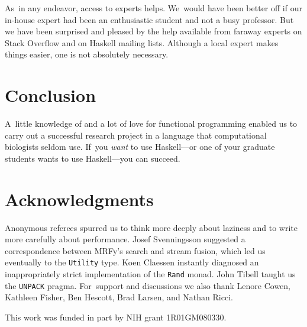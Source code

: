 \documentclass[]{jfp1}
\newcommand\mrfy{MRFy} %
\begin{document}


As~in any endeavor, access to experts helps.
We~would have been better off if our in-house expert had been an
enthusiastic student and not a busy professor.
But we have been surprised and pleased by the help available from
faraway experts on Stack Overflow and on Haskell mailing lists.
Although a local expert makes things easier, one is not
 absolutely necessary.

\section{Conclusion}

A~little knowledge of and a lot of love for functional programming
enabled us to carry out a successful research project in a language
that computational biologists seldom use.
If~you \emph{want} to use Haskell---or one of your graduate students
wants to use Haskell---you can
succeed. 




%  

 

\section*{Acknowledgments}

Anonymous referees spurred us to think
more deeply about laziness and to write more carefully about performance.
Josef Svenningsson suggested a correspondence between \mrfy's search
and stream fusion, which led us eventually to the \texttt{Utility} type.
Koen Claessen instantly diagnosed an inappropriately strict
implementation of the \texttt{Rand} monad.
John Tibell taught us the \texttt{UNPACK} pragma.
For~support and discussions 
we also thank Lenore Cowen, Kathleen Fisher, Ben Hescott, Brad
Larsen, and Nathan Ricci.

This work was funded in part by NIH grant 1R01GM080330.
\end{document}
